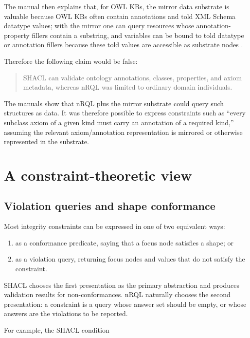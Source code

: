 \documentclass[11pt,letterpaper]{article}
\newcommand{\nrql}{nRQL}
\newcommand{\shacl}{SHACL}
\newcommand{\owl}{OWL}
\begin{document}
The manual then explains that, for \owl{} KBs, the mirror data substrate is valuable because \owl{} KBs often contain annotations and told XML Schema datatype values; with the mirror one can query resources whose annotation-property fillers contain a substring, and variables can be bound to told datatype or annotation fillers because these told values are accessible as substrate nodes \cite[pp.~141--143]{racerug}.

Therefore the following claim would be false:

\begin{quote}
\shacl{} can validate ontology annotations, classes, properties, and axiom metadata, whereas \nrql{} was limited to ordinary domain individuals.
\end{quote}

The manuals show that \nrql{} plus the mirror substrate could query such structures as data. It was therefore possible to express constraints such as ``every subclass axiom of a given kind must carry an annotation of a required kind,'' assuming the relevant axiom/annotation representation is mirrored or otherwise represented in the substrate.

\section{A constraint-theoretic view}

\subsection{Violation queries and shape conformance}

Most integrity constraints can be expressed in one of two equivalent ways:

\begin{enumerate}[leftmargin=2em]
  \item as a conformance predicate, saying that a focus node satisfies a shape; or
  \item as a violation query, returning focus nodes and values that do not satisfy the constraint.
\end{enumerate}

\shacl{} chooses the first presentation as the primary abstraction and produces validation results for non-conformances. \nrql{} naturally chooses the second presentation: a constraint is a query whose answer set should be empty, or whose answers are the violations to be reported.

For example, the \shacl{} condition
\end{document}
